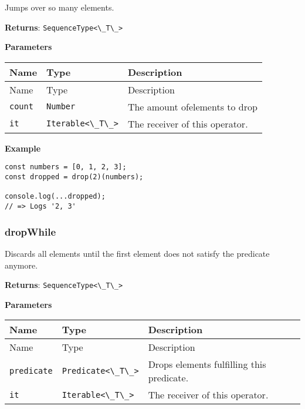Jumps over so many elements.

\textbf{Returns}: \passthrough{\lstinline!SequenceType<\_T\_>!}

\textbf{Parameters}

\begin{longtable}[]{
  >{\raggedright\arraybackslash}p{}
  >{\raggedright\arraybackslash}p{}
  >{\raggedright\arraybackslash}p{}@{}}

\toprule\noalign{}
Name & Type & Description \\
\midrule\noalign{}
\endfirsthead
\toprule\noalign{}
Name & Type & Description \\
\midrule\noalign{}
\endhead
\bottomrule\noalign{}
\endlastfoot
\passthrough{\lstinline!count!} & \passthrough{\lstinline!Number!} & The
amount ofelements to drop \\
\passthrough{\lstinline!it!} & \passthrough{\lstinline!Iterable<\_T\_>!}
& The receiver of this operator. \\
\end{longtable}

\textbf{Example}

\begin{lstlisting}[label=30264928-f65c-4618-9003-3370ee05bb51]
const numbers = [0, 1, 2, 3];
const dropped = drop(2)(numbers);
                                 
console.log(...dropped);
// => Logs '2, 3'
\end{lstlisting}

\hypertarget{66ea1665-a0b4-4fa6-887f-aeb9507f83b2}{%
\subsubsection{dropWhile}\label{66ea1665-a0b4-4fa6-887f-aeb9507f83b2}}

Discards all elements until the first element does not satisfy the
predicate anymore.

\textbf{Returns}: \passthrough{\lstinline!SequenceType<\_T\_>!}

\textbf{Parameters}

\begin{longtable}[]{
  >{\raggedright\arraybackslash}p{}
  >{\raggedright\arraybackslash}p{}
  >{\raggedright\arraybackslash}p{}@{}}

\toprule\noalign{}
Name & Type & Description \\
\midrule\noalign{}
\endfirsthead
\toprule\noalign{}
Name & Type & Description \\
\midrule\noalign{}
\endhead
\bottomrule\noalign{}
\endlastfoot
\passthrough{\lstinline!predicate!} &
\passthrough{\lstinline!Predicate<\_T\_>!} & Drops elements fulfilling
this predicate. \\
\passthrough{\lstinline!it!} & \passthrough{\lstinline!Iterable<\_T\_>!}
& The receiver of this operator. \\
\end{longtable}

